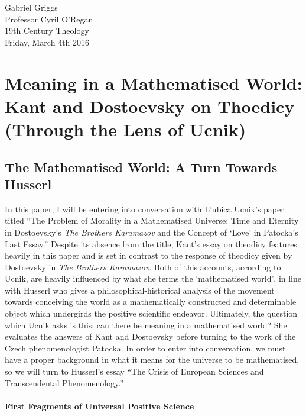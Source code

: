 \documentclass[12pt]{article}
\begin{document}
\singlespacing
{\raggedleft{}Gabriel Griggs} \\
Professor Cyril O'Regan \\
19th Century Theology \\
Friday, March 4th 2016\\

\section*{Meaning in a Mathematised World: Kant and Dostoevsky on Thoedicy (Through the Lens of Ucnik)}

\doublespacing
\subsection*{The Mathematised World: A Turn Towards Husserl}

In this paper, I will be entering into conversation with L'ubica Ucnik's paper titled ``The Problem of Morality in a Mathematised Universe: Time and Eternity in Dostoevsky's \emph{The Brothers Karamazov} and the Concept of `Love' in Patocka's Last Essay.'' Despite its absence from the title, Kant's essay on theodicy features heavily in this paper and is set in contrast to the response of theodicy given by Dostoevsky in \emph{The Brothers Karamazov}. Both of this accounts, according to Ucnik, are heavily influenced by what she terms the `mathematised world', in line with Husserl who gives a philosophical-historical analysis of the movement towards conceiving the world as a mathematically constructed and determinable object which undergirds the positive scientific endeavor. Ultimately, the question which Ucnik asks is this: can there be meaning in a mathematised world? She evaluates the answers of Kant and Dostoevsky before turning to the work of the Czech phenomenologist Patocka. In order to enter into conversation, we must have a proper background in what it means for the universe to be mathematised, so we will turn to Husserl's essay ``The Crisis of European Sciences and Transcendental Phenomenology.''

\paragraph*{First Fragments of Universal Positive Science}
\end{document}
